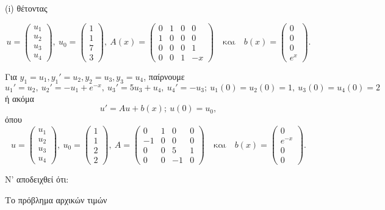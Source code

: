 \documentclass[a4paper,twoside,11pt]{book}
\begin{document}
\begin{Paradeigma}{(i) θέτοντας}
\begin{rlist}
\[    u = \begin{pmatrix} u_1 \\ u_2 \\ u_3 \\ u_4 \end{pmatrix}, \ u_0 = \begin{pmatrix} 1 \\ 1 \\ 7 \\ 3 \end{pmatrix}, \ A(x) = \begin{pmatrix} 0 & 1 & 0 & 0 \\ 1 & 0 & 0 & 0 \\ 0 & 0 & 0 & 1 \\ 0 & 0 & 1 & -x \end{pmatrix} \quad \text{και} \quad b(x) = \begin{pmatrix} 0 \\ 0 \\ 0 \\ e^x \end{pmatrix}.
\]
    \item Για $y_1=u_1, y_1'=u_2, y_2=u_3, y_3=u_4$, παίρνουμε
\[
    u_1'=u_2, \ u_2'=-u_1+e^{-x}, \ u_3'=5u_3+u_4, \ u_4'=-u_3; \ u_1(0)=u_2(0)=1, \ u_3(0)=u_4(0)=2
\]
ή ακόμα
\[
    u' = Au+b(x); \ u(0)=u_0,
\]
όπου
\[
    u = \begin{pmatrix} u_1 \\ u_2 \\ u_3 \\ u_4 \end{pmatrix}, \ u_0 = \begin{pmatrix} 1 \\ 1 \\ 2 \\ 2 \end{pmatrix}, \ A = \begin{pmatrix} 0 & 1 & 0 & 0 \\ -1 & 0 & 0 & 0 \\ 0 & 0 & 5 & 1 \\ 0 & 0 & -1 & 0 \end{pmatrix} \quad \text{και} \quad b(x) = \begin{pmatrix} 0 \\ e^{-x} \\ 0 \\ 0 \end{pmatrix}.
\]
\end{rlist}
\end{Paradeigma}

\begin{Paradeigma}{Ν' αποδειχθεί ότι:}
\begin{rlist}
    \item Το πρόβλημα αρχικών τιμών
\end{rlist}
\end{Paradeigma}
\end{document}
